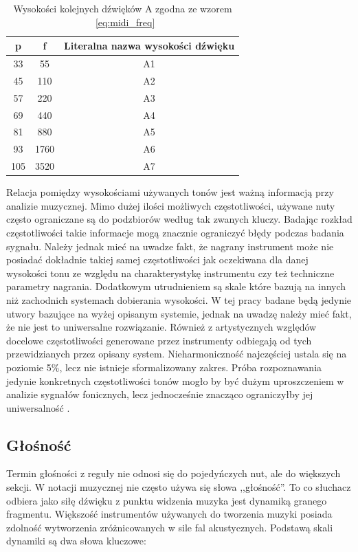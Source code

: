 \documentclass[12pt,a4paper,twoside]{mwart}
\begin{document}
\begin{table}[ht]
  \begin{center}
    \begin{tabular}{ |c|c|c| } 
    \hline
    p & f & Literalna nazwa wysokości dźwięku\\
    \hline
    33 & 55 & A1\\
    45 & 110 & A2\\
    57 & 220 & A3\\
    69 & 440 & A4\\
    81 & 880 & A5\\
    93 & 1760 & A6\\
    105 & 3520 & A7\\
    \hline
    \end{tabular}
  \end{center}
  \caption{Wysokości kolejnych dźwięków A zgodna ze wzorem ~\ref{eq:midi_freq}}
  \label{tab:FqMidi}
\end{table}

Relacja pomiędzy wysokościami używanych tonów jest ważną informacją przy analizie muzycznej. Mimo dużej ilości możliwych częstotliwości, używane nuty często ograniczane są do podzbiorów według tak zwanych kluczy. Badając rozkład częstotliwości takie informacje mogą znacznie ograniczyć błędy podczas badania sygnału. Należy jednak mieć na uwadze fakt, że nagrany instrument może nie posiadać dokładnie takiej samej częstotliwości jak oczekiwana dla danej wysokości tonu ze względu na charakterystykę instrumentu czy też techniczne parametry nagrania. Dodatkowym utrudnieniem są skale które bazują na innych niż zachodnich systemach dobierania wysokości. W tej pracy badane będą jedynie utwory bazujące na wyżej opisanym systemie, jednak na uwadzę należy mieć fakt, że nie jest to uniwersalne rozwiązanie. Również z artystycznych względów docelowe częstotliwości generowane przez instrumenty odbiegają od tych przewidzianych przez opisany system. Nieharmoniczność najczęściej ustala się na poziomie 5\%, lecz nie istnieje sformalizowany zakres. Próba rozpoznawania jedynie konkretnych częstotliwości tonów mogło by być dużym uproszczeniem w analizie sygnałów fonicznych, lecz jednocześnie znacząco ograniczyłby jej uniwersalność 
\cite[64-65]{Homerecording:DlaKazdego}
 \cite[7-11]{Transcription:Anssi:SignalProcessingMethods}
 .

\subsection{Głośność} \label{sec:loudness}
Termin głośności z reguły nie odnosi się do pojedyńczych nut, ale do większych sekcji. W notacji muzycznej nie często używa się słowa ,,głośność''. To co słuchacz odbiera jako siłę dźwięku z punktu widzenia muzyka jest dynamiką granego fragmentu. Większość instrumentów używanych do tworzenia muzyki posiada zdolność wytworzenia zróżnicowanych w sile fal akustycznych. Podstawą skali dynamiki są dwa słowa kluczowe:
\end{document}
